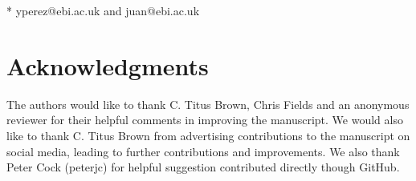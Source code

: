 \documentclass[10pt,letterpaper]{article}
\begin{document}
\begin{flushleft}
\bigskip

* yperez@ebi.ac.uk and juan@ebi.ac.uk

\end{flushleft}




\linenumbers



\section*{Acknowledgments}

The authors would like to thank C. Titus Brown, Chris Fields and an
anonymous reviewer for their helpful comments in improving the
manuscript. We would also like to thank C. Titus Brown from
advertising contributions to the manuscript on social media, leading
to further contributions and improvements. We also thank Peter Cock
(peterjc) for helpful suggestion contributed directly though GitHub.

\nolinenumbers

 
\end{document}

